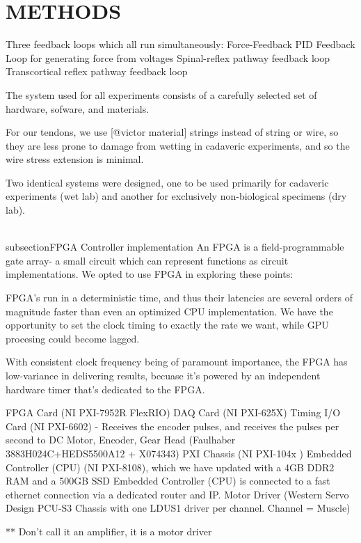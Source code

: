 \section{METHODS}

Three feedback loops which all run simultaneously:
  Force-Feedback PID Feedback Loop for generating force from voltages
  Spinal-reflex pathway feedback loop
  Transcortical reflex pathway feedback loop


 The system used for all experiments consists of a carefully selected set of hardware, sofware, and materials.

For our tendons, we use [@victor material] strings instead of string or wire, so they are less prone to damage from wetting in cadaveric experiments, and so the wire stress extension is minimal.

 Two identical systems were designed, one to be used primarily for cadaveric experiments (wet lab) and another for exclusively non-biological specimens (dry lab).

\\subsection{FPGA Controller implementation} %
\label{sub:fpga_controller_implementation}
An FPGA is a field-programmable gate array- a small circuit which can represent functions as circuit implementations.
We opted to use FPGA in exploring these points:
\item FPGA's run in a deterministic time, and thus their latencies are several orders of magnitude faster than even an optimized CPU implementation. We have the opportunity to set the clock timing to exactly the rate we want, while GPU procesing could become lagged.
\item With consistent clock frequency being of paramount importance, the FPGA has low-variance in delivering results, becuase it's powered by an independent hardware timer that's dedicated to the FPGA.

FPGA Card (NI PXI-7952R FlexRIO)
DAQ Card (NI PXI-625X)
Timing I/O Card (NI PXI-6602) - Receives the encoder pulses, and receives the pulses per second to 
DC Motor, Encoder, Gear Head  (Faulhaber 3883H024C+HEDS5500A12 + X074343)
PXI Chassis (NI PXI-104x )
Embedded Controller (CPU) (NI PXI-8108), which we have updated with a 4GB DDR2 RAM and a 500GB SSD
Embedded Controller (CPU) is connected to a fast ethernet connection via a dedicated router and IP.
Motor Driver (Western Servo Design PCU-S3 Chassis with one LDUS1 driver per channel. Channel = Muscle)

** Don't call it an amplifier, it is a motor driver

